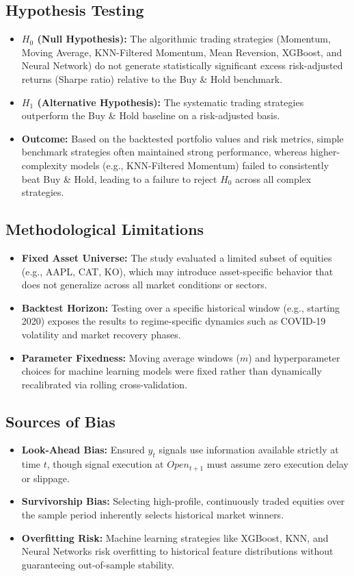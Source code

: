 \documentclass{article}
\begin{document}
\subsection{Hypothesis Testing}
\begin{itemize}
    \item \textbf{$H_0$ (Null Hypothesis):} The algorithmic trading strategies (Momentum, Moving Average, KNN-Filtered Momentum, Mean Reversion, XGBoost, and Neural Network) do not generate statistically significant excess risk-adjusted returns (Sharpe ratio) relative to the Buy \& Hold benchmark.
    \item \textbf{$H_1$ (Alternative Hypothesis):} The systematic trading strategies outperform the Buy \& Hold baseline on a risk-adjusted basis.
    \item \textbf{Outcome:} Based on the backtested portfolio values and risk metrics, simple benchmark strategies often maintained strong performance, whereas higher-complexity models (e.g., KNN-Filtered Momentum) failed to consistently beat Buy \& Hold, leading to a failure to reject $H_0$ across all complex strategies.
\end{itemize}

\subsection{Methodological Limitations}
\begin{itemize}
    \item \textbf{Fixed Asset Universe:} The study evaluated a limited subset of equities (e.g., AAPL, CAT, KO), which may introduce asset-specific behavior that does not generalize across all market conditions or sectors.
    \item \textbf{Backtest Horizon:} Testing over a specific historical window (e.g., starting 2020) exposes the results to regime-specific dynamics such as COVID-19 volatility and market recovery phases.
    \item \textbf{Parameter Fixedness:} Moving average windows ($m$) and hyperparameter choices for machine learning models were fixed rather than dynamically recalibrated via rolling cross-validation.
\end{itemize}

\subsection{Sources of Bias}
\begin{itemize}
    \item \textbf{Look-Ahead Bias:} Ensured $y_t$ signals use information available strictly at time $t$, though signal execution at $Open_{t+1}$ must assume zero execution delay or slippage.
    \item \textbf{Survivorship Bias:} Selecting high-profile, continuously traded equities over the sample period inherently selects historical market winners.
    \item \textbf{Overfitting Risk:} Machine learning strategies like XGBoost, KNN, and Neural Networks risk overfitting to historical feature distributions without guaranteeing out-of-sample stability.
\end{itemize}
\end{document}
